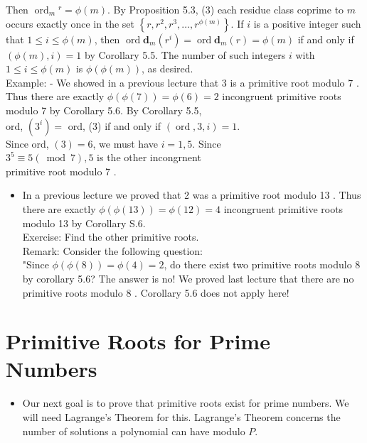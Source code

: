 \documentclass[10pt]{article}
\begin{document}
Then $\operatorname{ord}_{m}{ }^{r}=\phi(m)$. By Proposition 5.3, (3) each residue class coprime to $m$ occurs exactly once in the set $\left\{r, r^{2}, r^{3}, \ldots, r^{\phi(m)}\right\}$. If $i$ is a positive integer such that $1 \leq i \leq \phi(m)$, then $\operatorname{ord} \boldsymbol{d}_{m}\left(r^{i}\right)=\operatorname{ord} \boldsymbol{d}_{m}(r)=\phi(m)$ if and only if $(\phi(m), i)=1$ by Corollary 5.5. The number of such integers $i$ with $1 \leqslant i \leqslant \phi(m)$ is $\phi(\phi(m))$, as desired.\\
Example: - We showed in a previous lecture that 3 is a primitive root modulo 7 .\\
Thus there are exactly $\phi(\phi(7))=\phi(6)=2$ incongruent primitive roots modulo 7 by Corollary 5.6. By Corollary 5.5,\\
ord, $\left(3^{i}\right)=$ ord, (3) if and only if $(\operatorname{ord}, 3, i)=1$.\\
Since ord, $(3)=6$, we must have $i=1,5$. Since\\
$3^{5} \equiv 5(\bmod 7), 5$ is the other incongrnent\\
primitive root modulo 7 .

\begin{itemize}
  \item In a previous lecture we proved that 2 was a primitive root modulo 13 . Thus there are exactly $\phi(\phi(13))=\phi(12)=4$ incongruent primitive roots modulo 13 by Corollary S.6.\\
Exercise: Find the other primitive roots.\\
Remark: Consider the following question:\\
"Since $\phi(\phi(8))=\phi(4)=2$, do there exist two primitive roots modulo 8 by corollary 5.6? The answer is no! We proved last lecture that there are no primitive roots modulo 8 . Corollary 5.6 does not apply here!
\end{itemize}

\section*{Primitive Roots for Prime Numbers}
\begin{itemize}
  \item Our next goal is to prove that primitive roots exist for prime numbers. We will need Lagrange's Theorem for this. Lagrange's Theorem concerns the number of solutions a polynomial can have modulo $P$.
\end{itemize}
\end{document}
